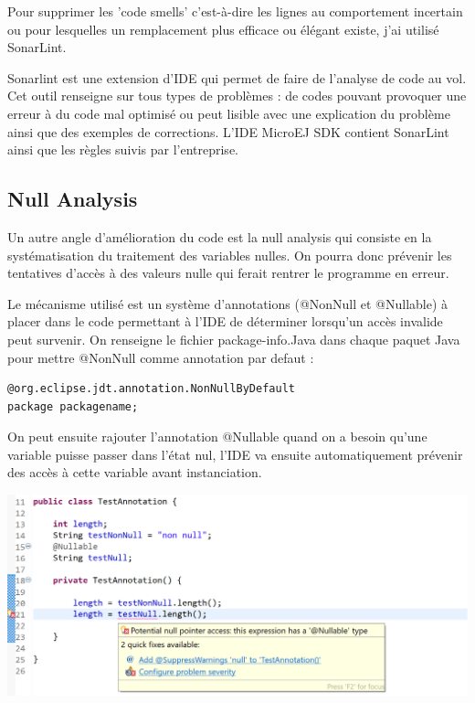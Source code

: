 \documentclass[french,a4paper,12pt]{report}
\begin{document}
Pour supprimer les 'code smells' c'est-à-dire les lignes au comportement incertain ou pour lesquelles un remplacement plus efficace ou élégant existe, j'ai utilisé SonarLint.

Sonarlint est une extension d’IDE qui permet de faire de l’analyse de code au vol. Cet outil renseigne sur tous types de problèmes : de codes pouvant provoquer une erreur à du code mal optimisé ou peut lisible avec une explication du problème ainsi que des exemples de corrections.
L'IDE MicroEJ SDK contient SonarLint ainsi que les règles suivis par l'entreprise.

\subsection{Null Analysis}

Un autre angle d'amélioration du code est la null analysis qui consiste en la systématisation du traitement des variables nulles. On pourra donc prévenir les tentatives d'accès à des valeurs nulle qui ferait rentrer le programme en erreur. 

Le mécanisme utilisé est un système d'annotations (@NonNull et @Nullable) à placer dans le code permettant à l'IDE de déterminer lorsqu'un accès invalide peut survenir. On renseigne le fichier package-info.Java dans chaque paquet Java pour mettre @NonNull comme annotation par defaut :
\begin{lstlisting}
@org.eclipse.jdt.annotation.NonNullByDefault
package packagename;
\end{lstlisting}
On peut ensuite rajouter l'annotation @Nullable quand on a besoin qu'une variable puisse passer dans l'état nul, l'IDE va ensuite automatiquement prévenir des accès à cette variable avant instanciation.

\begin{center}
  \includegraphics[width=\textwidth]{ressources/images/nonnull.png}
\end{center}
\end{document}
